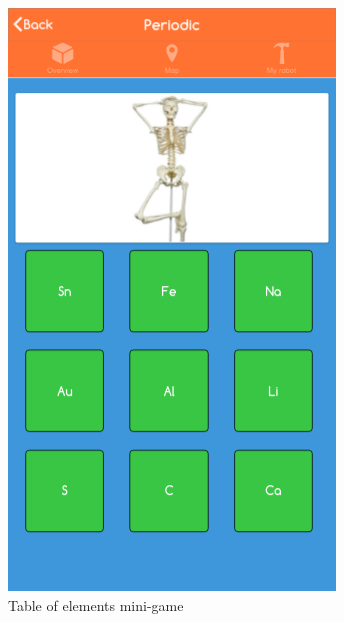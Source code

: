 \begin{figure}[H]
\begin{minipage}[b]{0.35\textwidth}
    \includegraphics[width=\textwidth]{images/app/Periodic.png}
    \caption{Table of elements mini-game}
  \end{minipage}
  \hfill
  \begin{minipage}[b]{0.35\textwidth}

\end{minipage}
\end{figure}
